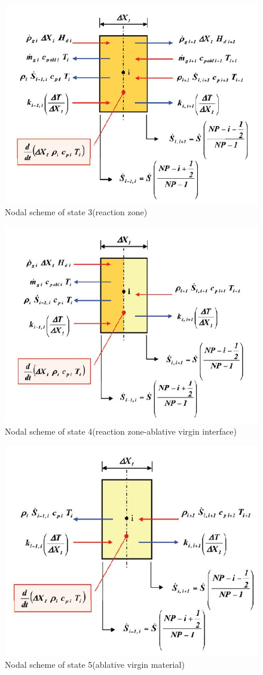 \documentclass[a4paper, 12pt]{article} %
\begin{document}
\begin{figure}[h!]
  \centering
  \includegraphics[width=0.7 \linewidth]{react_nodal.jpg}
  \caption{Nodal scheme of state 3(reaction zone)}
  \label{fig:react}
\end{figure}
\newpage
\begin{figure}[h!]
  \centering
  \includegraphics[width=0.75 \linewidth]{react_virgin.jpg}
  \caption{Nodal scheme of state 4(reaction zone-ablative virgin interface)}
  \label{fig:rv}
\end{figure}
\newpage
\begin{figure}[h!]
  \centering
  \includegraphics[width=0.75 \linewidth]{virgin.jpg}
  \caption{Nodal scheme of state 5(ablative virgin material)}
  \label{fig:vir}
\end{figure}
\end{document}

